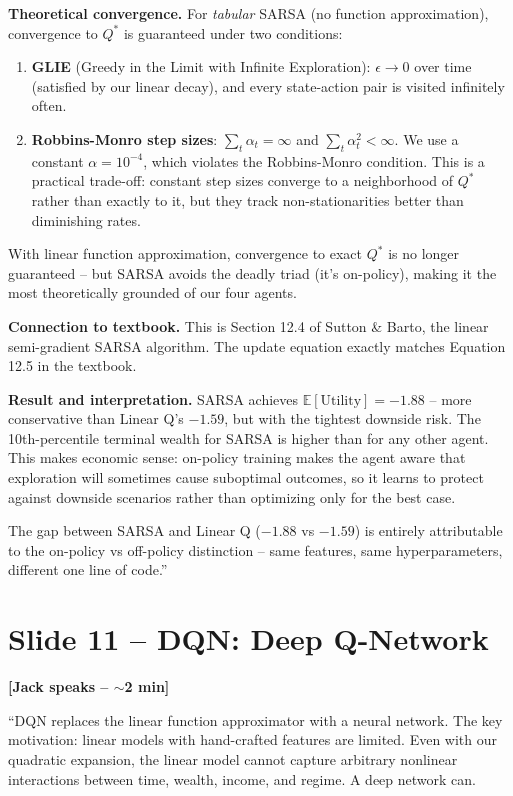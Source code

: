 \documentclass[11pt, letterpaper]{article}
\begin{document}
\textbf{Theoretical convergence.} For \emph{tabular} SARSA (no function approximation), convergence to $Q^*$ is guaranteed under two conditions:
\begin{enumerate}
\item \textbf{GLIE} (Greedy in the Limit with Infinite Exploration): $\epsilon \to 0$ over time (satisfied by our linear decay), and every state-action pair is visited infinitely often.
\item \textbf{Robbins-Monro step sizes}: $\sum_t \alpha_t = \infty$ and $\sum_t \alpha_t^2 < \infty$. We use a constant $\alpha = 10^{-4}$, which violates the Robbins-Monro condition. This is a practical trade-off: constant step sizes converge to a neighborhood of $Q^*$ rather than exactly to it, but they track non-stationarities better than diminishing rates.
\end{enumerate}
With linear function approximation, convergence to exact $Q^*$ is no longer guaranteed -- but SARSA avoids the deadly triad (it's on-policy), making it the most theoretically grounded of our four agents.

\textbf{Connection to textbook.} This is Section 12.4 of Sutton \& Barto, the linear semi-gradient SARSA algorithm. The update equation exactly matches Equation 12.5 in the textbook.

\textbf{Result and interpretation.} SARSA achieves $\mathbb{E}[\text{Utility}] = -1.88$ -- more conservative than Linear Q's $-1.59$, but with the tightest downside risk. The 10th-percentile terminal wealth for SARSA is higher than for any other agent. This makes economic sense: on-policy training makes the agent aware that exploration will sometimes cause suboptimal outcomes, so it learns to protect against downside scenarios rather than optimizing only for the best case.

The gap between SARSA and Linear Q ($-1.88$ vs $-1.59$) is entirely attributable to the on-policy vs off-policy distinction -- same features, same hyperparameters, different one line of code.''

\section{Slide 11 -- DQN: Deep Q-Network}

\textbf{[Jack speaks -- $\sim$2 min]}

``DQN replaces the linear function approximator with a neural network. The key motivation: linear models with hand-crafted features are limited. Even with our quadratic expansion, the linear model cannot capture arbitrary nonlinear interactions between time, wealth, income, and regime. A deep network can.
\end{document}
